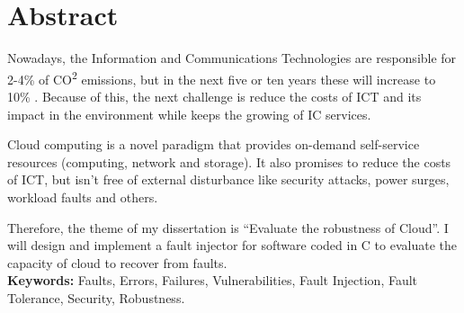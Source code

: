 \newpage
{}

\section*{Abstract}

Nowadays, the Information and Communications Technologies are responsible for 2-4\% of CO\textsuperscript{2} emissions, but in the next five or ten years these will increase to 10\% \cite{wolter2012resilience}. Because of this, the next challenge is reduce the costs of ICT and its impact in the environment while keeps the growing of IC services.


Cloud computing is a novel paradigm that provides on-demand self-service resources (computing, network and storage). It also promises to reduce the costs of ICT, but isn't free of external disturbance like security attacks, power surges, workload faults and others.

Therefore, the theme of my dissertation is ``Evaluate the robustness of Cloud''. I will design and implement a fault injector for software coded in C to evaluate the capacity of cloud to recover from faults.\\





\textbf{Keywords:} Faults, Errors, Failures, Vulnerabilities, Fault Injection, Fault Tolerance, Security, Robustness.

